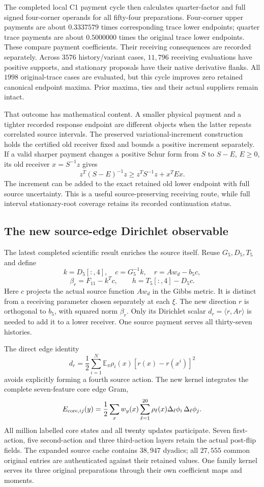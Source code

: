 The completed local C1 payment cycle then calculates quarter-factor and full signed four-corner operands for all fifty-four preparations. Four-corner upper payments are about $0.3337579$ times corresponding trace lower endpoints; quarter trace payments are about $0.5000000$ times the original trace lower endpoints. These compare payment coefficients. Their receiving consequences are recorded separately. Across $3576$ history/variant cases, $11{,}796$ receiving evaluations have positive supports, and stationary proposals have their native derivative flanks. All $1998$ original-trace cases are evaluated, but this cycle improves zero retained canonical endpoint maxima. Prior maxima, ties and their actual suppliers remain intact. 

That outcome has mathematical content. A smaller physical payment and a tighter recorded response endpoint are different objects when the latter repeats correlated source intervals. The preserved variational-increment construction holds the certified old receiver fixed and bounds a positive increment separately. If a valid sharper payment changes a positive Schur form from $S$ to $S-E$, $E\geq0$, its old receiver $x=S^{-1}z$ gives
\[
 z^T(S-E)^{-1}z\geq z^TS^{-1}z+x^TEx.
\]
The increment can be added to the exact retained old lower endpoint with full source uncertainty. This is a useful source-preserving receiving route, while full interval stationary-root coverage retains its recorded continuation status. 

\subsection{The new source-edge Dirichlet observable}

The latest completed scientific result enriches the source itself. Reuse $G_5,D_5,T_5$ and define
\[
 k=D_5[:,4],\quad c=G_5^{-1}k,\quad
 r=Aw_d-b_5c,
\]
\[
 \beta_r=F_{11}-k^Tc,\qquad
 h=T_5[:,4]-D_5c.
\]
Here $c$ projects the actual source function $Aw_d$ in the Gibbs metric. It is distinct from a receiving parameter chosen separately at each $\xi$. The new direction $r$ is orthogonal to $b_5$, with squared norm $\beta_r$. Only its Dirichlet scalar $d_r=\langle r,Ar\rangle$ is needed to add it to a lower receiver. One source payment serves all thirty-seven histories. 

The direct edge identity
\[
 d_r=\frac12\sum_{i=1}^N\mathbb E_\pi
                 \rho_i(x)[r(x)-r(x^i)]^2
\]
avoids explicitly forming a fourth source action. The new kernel integrates the complete seven-feature core edge Gram,
\[
 E_{{\rm core},ij}(y)=\frac12\sum_xw_y(x)
          \sum_{\ell=1}^{20}\rho_\ell(x)
              \Delta_\ell\phi_i\,\Delta_\ell\phi_j.
\]
All million labelled core states and all twenty updates participate. Seven first-action, five second-action and three third-action layers retain the actual post-flip fields. The expanded source cache contains $38{,}947$ dyadics; all $27{,}555$ common original entries are authenticated against their retained values. One family kernel serves its three original preparations through their own coefficient maps and moments.

